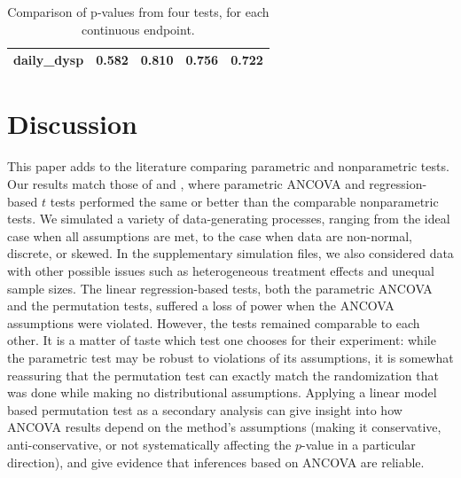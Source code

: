 \documentclass[12pt]{article}
\begin{document}
\begin{table}[]
\begin{tabular}{l|cccc}
daily\_dysp   & 0.582                      & 0.810                                                                                & 0.756                                                                        & 0.722                                                                        \\
\hline
\end{tabular}
\caption{Comparison of p-values from four tests, for each continuous endpoint.} 
\end{table}

\section{Discussion}\label{sec:discussion}

This paper adds to the literature comparing parametric and nonparametric tests.
Our results match those of \citet{vickers_parametric_2005} and \citet{anderson_empirical_1999}, where parametric ANCOVA and regression-based $t$ tests performed the same or better than the comparable nonparametric tests.
We simulated a variety of data-generating processes, ranging from the ideal case when all assumptions are met, 
to the case when data are non-normal, discrete, or skewed.
In the supplementary simulation files, we also considered data with other possible issues such as heterogeneous treatment effects and unequal sample sizes.
The linear regression-based tests, both the parametric ANCOVA and the permutation tests, suffered a loss of power when the ANCOVA assumptions were violated.
However, the tests remained comparable to each other.
It is a matter of taste which test one chooses for their experiment: while the parametric test may be robust to violations of its assumptions, it is somewhat reassuring that the permutation test can exactly match the randomization that was done while making no distributional assumptions.
Applying a linear model based permutation test as a secondary analysis can give insight into how ANCOVA results depend on the method's assumptions
(making it conservative, anti-conservative, or not systematically affecting the $p$-value in a particular direction),
and give evidence that inferences based on ANCOVA are reliable.
\end{document}
